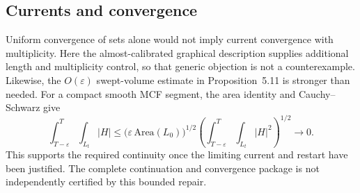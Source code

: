 \documentclass[10pt]{article}
\begin{document}
\subsection*{Currents and convergence}
Uniform convergence of sets alone would not imply current convergence with multiplicity. Here the almost-calibrated graphical description supplies additional length and multiplicity control, so that generic objection is not a counterexample. Likewise, the \(O(\varepsilon)\) swept-volume estimate in Proposition 5.11 is stronger than needed. For a compact smooth MCF segment, the area identity and Cauchy–Schwarz give \[\int_{T-\varepsilon}^T\!\int_{L_t}|H|
 \leq\bigl(\varepsilon\,\mathrm{Area}(L_0)\bigr)^{1/2}
       \left(\int_{T-\varepsilon}^T\!\int_{L_t}|H|^2\right)^{1/2}
 \longrightarrow0.\] This supports the required continuity once the limiting current and restart have been justified. The complete continuation and convergence package is not independently certified by this bounded repair.\par
\end{document}
